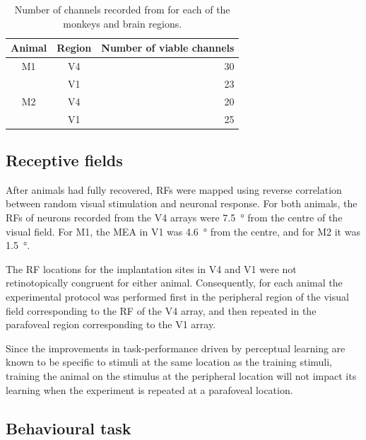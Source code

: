 \begin{table}[bthp]
\begin{center}
\begin{tabular}{ccr}
\toprule
Animal   & Region   & Number of viable channels \\
\midrule
\acs{M1} & \acs{V4} & 30 \\
         & \acs{V1} & 23 \\
\acs{M2} & \acs{V4} & 20 \\
         & \acs{V1} & 25 \\
\bottomrule
\end{tabular}
\end{center}
\caption{Number of channels recorded from for each of the monkeys and brain regions.}
\label{tab:nchannels}
\end{table}


\subsection{Receptive fields}

After animals had fully recovered, \acp{RF} were mapped using reverse correlation between random visual stimulation and neuronal response.
For both animals, the \acp{RF} of neurons recorded from the \ac{V4} arrays were \SI{7.5}{\degree} from the centre of the visual field.
For \ac{M1}, the \ac{MEA} in \ac{V1} was \SI{4.6}{\degree} from the centre, and for \ac{M2} it was \SI{1.5}{\degree}.

The \ac{RF} locations for the implantation sites in \ac{V4} and \ac{V1} were not retinotopically congruent for either animal.
Consequently, for each animal the experimental protocol was performed first in the peripheral region of the visual field corresponding to the \ac{RF} of the \ac{V4} array, and then repeated in the parafoveal region corresponding to the \ac{V1} array.

Since the improvements in task-performance driven by perceptual learning are known to be specific to stimuli at the same location as the training stimuli, training the animal on the stimulus at the peripheral location will not impact its learning when the experiment is repeated at a parafoveal location.


\subsection{Behavioural task}
\label{sec:pl_task}

